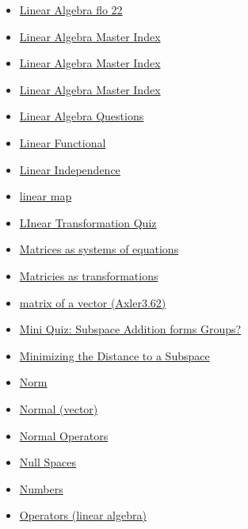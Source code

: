 \documentclass[11pt]{article}
\begin{document}
\begin{itemize}
\begin{itemize}
\begin{itemize}
\item \href{mathematics/linear\_algebra/KBe20math530flo22.org}{Linear Algebra flo 22}
\item \href{mathematics/linear\_algebra/KBxLinAlgMasterIndex.org}{Linear Algebra Master Index}
\item \href{mathematics/linear\_algebra/index.org}{Linear Algebra Master Index}
\item \href{mathematics/linear\_algebra/KBe2020math530index.org}{Linear Algebra Master Index}
\item \href{mathematics/linear\_algebra/KBe20math530floQuestions.org}{Linear Algebra Questions}
\item \href{mathematics/linear\_algebra/KBrefLinearFunctional.org}{Linear Functional}
\item \href{mathematics/linear\_algebra/KB20math530refLinearIndependence.org}{Linear Independence}
\item \href{mathematics/linear\_algebra/KBrefLinearMap.org}{linear map}
\item \href{mathematics/linear\_algebra/KBe20math530retLinearTransformationQuiz.org}{LInear Transformation Quiz}
\item \href{mathematics/linear\_algebra/KBe2020math530floMatriciesSystemsEquations.org}{Matrices as systems of equations}
\item \href{mathematics/linear\_algebra/KBE2020math501floMatriciesAsTransformations.org}{Matricies as transformations}
\item \href{mathematics/linear\_algebra/KBrefMatrixOfVector.org}{matrix of a vector (Axler3.62)}
\item \href{mathematics/linear\_algebra/KBe20math530retMiniQuizSubspaceAdditionGroup.org}{Mini Quiz: Subspace Addition forms Groups?}
\item \href{mathematics/linear\_algebra/KBrefMinimizingDistanceToSubspace.org}{Minimizing the Distance to a Subspace}
\item \href{mathematics/linear\_algebra/KBrefNorm.org}{Norm}
\item \href{mathematics/linear\_algebra/KBrefNormal.org}{Normal (vector)}
\item \href{mathematics/linear\_algebra/KBrefNormalOperators.org}{Normal Operators}
\item \href{mathematics/linear\_algebra/KBrefNullSpace.org}{Null Spaces}
\item \href{mathematics/linear\_algebra/KBe2020math530floNumbers.org}{Numbers}
\item \href{mathematics/linear\_algebra/KBrefOperators.org}{Operators (linear algebra)}

\end{itemize}
\end{itemize}
\end{itemize}
\end{document}
